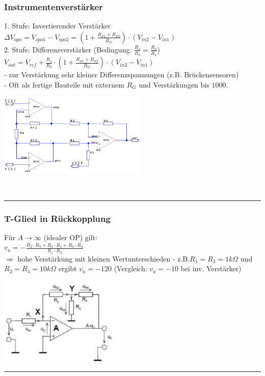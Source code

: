 		\begin{minipage}{12cm}
		\subsubsection{Instrumentenverstärker}
			1. Stufe: Invertierender Verstärker \\
			$\Delta V_{opo}=V_{opo1}-V_{opo2}=(1+\frac{R_{F1}+R_{F2}}{R_G})\cdot(V_{in2}-V_{in1})$
			\smallskip \\
			2. Stufe: Differenzverstärker (Bedingung: $\frac{R_4}{R_3}=\frac{R_2}{R_1}$)\\
			$V_{out}=V_{ref}+\frac{R_4}{R_3}\cdot(1+\frac{R_{F1}+R_{F2}}{R_G})\cdot(V_{in2}-V_{in1})$
			\bigskip \\
			- zur Verstärkung sehr kleiner Differenzspannungen (z.B. Brückensensoren) \\
			- Oft als fertige Bauteile mit externem $R_G$ und Verstärkungen bis $1000$. \\
			\end{minipage}
			\begin{minipage}{7cm}
          		\includegraphics[width=7cm]{./images/instramp.png} 
       	 	\end{minipage}\\
\hrule     
 	 
      	 \begin{minipage}{12cm}	
       	 \subsubsection{T-Glied in Rückkopplung}
       	 	Für $A \to \infty$ (idealer OP) gilt: \smallskip \\
       	 	$v_u=-\frac{R_2 \cdot R_3 + R_2 \cdot R_4 + R_3 \cdot R_4}{R_1 \cdot R_3}$
       	 	\bigskip \\
       	 	$\Longrightarrow$ hohe Verstärkung mit kleinen Wertunterschieden - 
       	 	z.B.$R_1=R_3=1k\Omega$ und $R_2=R_4=10k\Omega$ ergibt $v_u=-120$ 
       	 	(Vergleich: $v_u=-10$ bei inv. Verstärker) \\
       	 \end{minipage}
       	 \begin{minipage}{6cm}
       	 	\includegraphics[width=6cm]{./images/tglied.png}
       	 \end{minipage}   
\hrule   
 	 
